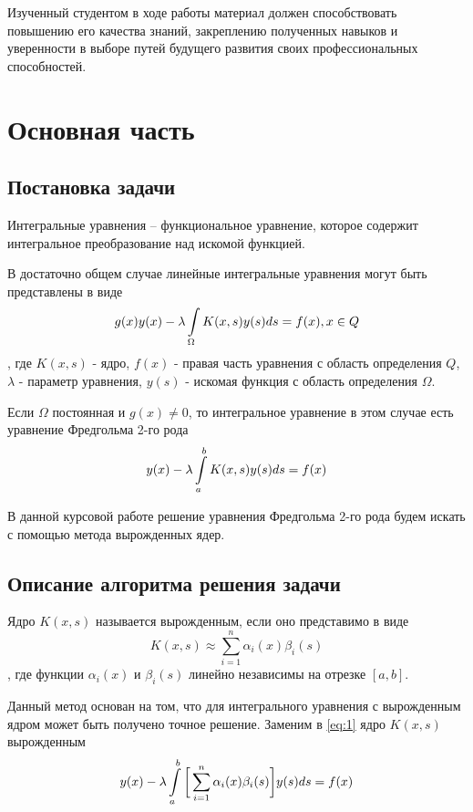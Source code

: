 \documentclass[14pt, a4paper]{extarticle}
\begin{document}
	Изученный студентом в ходе работы материал должен способствовать повышению его качества знаний, закреплению полученных навыков и уверенности в выборе путей будущего развития своих профессиональных способностей. 
	
	\section{Основная часть}
	\subsection{Постановка задачи}
		Интегральные уравнения -- функциональное уравнение, которое содержит интегральное преобразование над искомой функцией.
		
		В достаточно общем случае линейные интегральные уравнения могут быть представлены в виде
		\[ g(x)y(x) - \lambda \int\displaylimits_{\Omega} K(x, s)y(s)ds = f(x), x \in Q \]
		, где $K(x, s)$ - ядро, $f(x)$ - правая часть уравнения с область определения $Q$, $\lambda$ - параметр уравнения, $y(s)$ - искомая функция с область определения $\Omega$.
		
		Если $\Omega$ постоянная и $g(x) \neq 0$, то интегральное уравнение в этом случае есть уравнение Фредгольма 2-го рода
		\begin{equation}
			y(x) - \lambda \int\displaylimits_{a}^{b} K(x,s)y(s)ds = f(x)
			\label{eq:1}
		\end{equation}
		
		В данной курсовой работе решение уравнения Фредгольма 2-го рода будем искать с помощью метода вырожденных ядер.
	\subsection{Описание алгоритма решения задачи}
		Ядро $K(x,s)$ называется вырожденным, если оно представимо в виде
		\[ K(x,s) \approx \sum_{i=1}^{n} \alpha_i(x) \beta_i(s) \]
		, где функции $\alpha_i(x)$ и $\beta_i(s)$ линейно независимы на отрезке $[a, b]$.
		
		Данный метод основан на том, что для интегрального уравнения с вырожденным ядром может быть получено точное решение. Заменим в \ref{eq:1} ядро $K(x, s)$ вырожденным
		\begin{equation}
			y(x) - \lambda \int\displaylimits_{a}^{b} \bigg[\sum_{i=1}^{n} \alpha_i(x) \beta_i(s)\bigg] y(s)ds = f(x)
			\label{eq:2}
		\end{equation}
		
\end{document}
